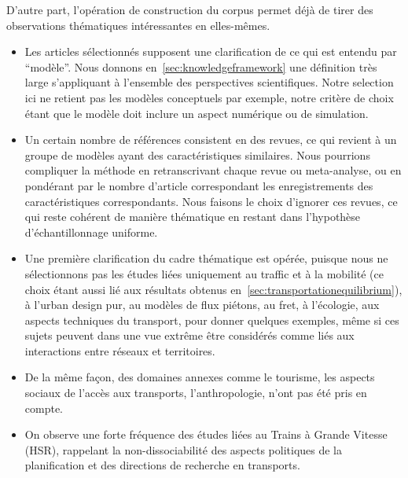 D'autre part, l'opération de construction du corpus permet déjà de tirer des observations thématiques intéressantes en elles-mêmes.

\begin{itemize}
\item Les articles sélectionnés supposent une clarification de ce qui est entendu par ``modèle''. Nous donnons en~\ref{sec:knowledgeframework} une définition très large s'appliquant à l'ensemble des perspectives scientifiques. Notre selection ici ne retient pas les modèles conceptuels par exemple, notre critère de choix étant que le modèle doit inclure un aspect numérique ou de simulation.
\item Un certain nombre de références consistent en des revues, ce qui revient à un groupe de modèles ayant des caractéristiques similaires. Nous pourrions compliquer la méthode en retranscrivant chaque revue ou meta-analyse, ou en pondérant par le nombre d'article correspondant les enregistrements des caractéristiques correspondants. Nous faisons le choix d'ignorer ces revues, ce qui reste cohérent de manière thématique en restant dans l'hypothèse d'échantillonnage uniforme.
\item Une première clarification du cadre thématique est opérée, puisque nous ne sélectionnons pas les études liées uniquement au traffic et à la mobilité (ce choix étant aussi lié aux résultats obtenus en~\ref{sec:transportationequilibrium}), à l'urban design pur, au modèles de flux piétons, au fret, à l'écologie, aux aspects techniques du transport, pour donner quelques exemples, même si ces sujets peuvent dans une vue extrême être considérés comme liés aux interactions entre réseaux et territoires.
\item De la même façon, des domaines annexes comme le tourisme, les aspects sociaux de l'accès aux transports, l'anthropologie, n'ont pas été pris en compte.
\item On observe une forte fréquence des études liées au Trains à Grande Vitesse (HSR), rappelant la non-dissociabilité des aspects politiques de la planification et des directions de recherche en transports.%
\end{itemize}


